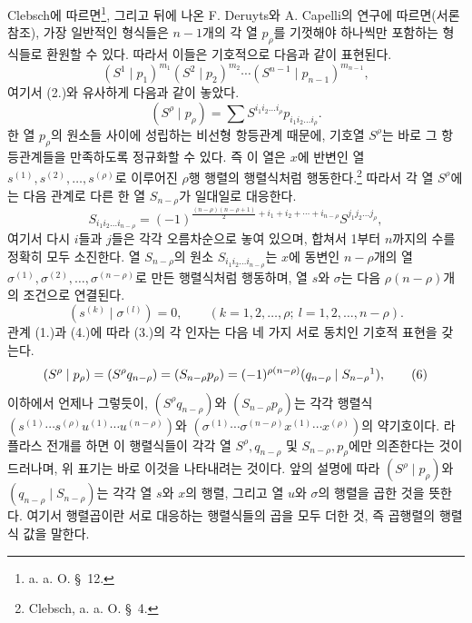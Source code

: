 Clebsch에 따르면\footnote{a. a. O. \S\ 12.}, 그리고 뒤에 나온 F. Deruyts와 A. Capelli의 연구에 따르면(서론 참조), 가장 일반적인 형식들은 $n-1$개의 각 열 $p_\rho$를 기껏해야 하나씩만 포함하는 형식들로 환원할 수 있다. 따라서 이들은 기호적으로 다음과 같이 표현된다.
\begin{equation}
 (S^1\mid p_1)^{m_1}(S^2\mid p_2)^{m_2}\cdots(S^{n-1}\mid p_{n-1})^{m_{n-1}},
\tag{3}
\end{equation}
여기서 (2.)와 유사하게 다음과 같이 놓았다.
\[
 (S^\rho\mid p_\rho)=\sum S^{i_1i_2\ldots i_\rho}p_{i_1i_2\ldots i_\rho}.
\]
한 열 $p_\rho$의 원소들 사이에 성립하는 비선형 항등관계 때문에, 기호열 $S^\rho$는 바로 그 항등관계들을 만족하도록 정규화할 수 있다. 즉 이 열은 $x$에 반변인 열 $s^{(1)},s^{(2)},\ldots,s^{(\rho)}$로 이루어진 $\rho$행 행렬의 행렬식처럼 행동한다.\footnote{Clebsch, a. a. O. \S\ 4.} 따라서 각 열 $S^\rho$에는 다음 관계로 다른 한 열 $S_{n-\rho}$가 일대일로 대응한다.
\begin{equation}
 S_{i_1i_2\ldots i_{n-\rho}}=(-1)^{\frac{(n-\rho)(n-\rho+1)}2+i_1+i_2+\cdots+i_{n-\rho}}S^{j_1j_2\ldots j_\rho},
\tag{4}
\end{equation}
여기서 다시 $i$들과 $j$들은 각각 오름차순으로 놓여 있으며, 합쳐서 1부터 $n$까지의 수를 정확히 모두 소진한다. 열 $S_{n-\rho}$의 원소 $S_{i_1i_2\ldots i_{n-\rho}}$는 $x$에 동변인 $n-\rho$개의 열 $\sigma^{(1)},\sigma^{(2)},\ldots,\sigma^{(n-\rho)}$로 만든 행렬식처럼 행동하며, 열 $s$와 $\sigma$는 다음 $\rho(n-\rho)$개의 조건으로 연결된다.
\begin{equation}
 (s^{(k)}\mid \sigma^{(l)})=0,\qquad(k=1,2,\ldots,\rho;\ l=1,2,\ldots,n-\rho).
\tag{5}
\end{equation}
관계 (1.)과 (4.)에 따라 (3.)의 각 인자는 다음 네 가지 서로 동치인 기호적 표현을 갖는다.
\begin{equation}
 (S^\rho\mid p_\rho)=(S^\rho q_{n-\rho})=(S_{n-\rho}p_\rho)=(-1)^{\rho(n-\rho)}(q_{n-\rho}\mid S_{n-\rho}\footnotemark),
\tag{6}
\end{equation}
이하에서 언제나 그렇듯이, $(S^\rho q_{n-\rho})$와 $(S_{n-\rho}p_\rho)$는 각각 행렬식
$(s^{(1)}\cdots s^{(\rho)}u^{(1)}\cdots u^{(n-\rho)})$와
$(\sigma^{(1)}\cdots\sigma^{(n-\rho)}x^{(1)}\cdots x^{(\rho)})$의 약기호이다. 라플라스 전개를 하면 이 행렬식들이 각각 열 $S^\rho,q_{n-\rho}$ 및 $S_{n-\rho},p_\rho$에만 의존한다는 것이 드러나며, 위 표기는 바로 이것을 나타내려는 것이다. 앞의 설명에 따라 $(S^\rho\mid p_\rho)$와 $(q_{n-\rho}\mid S_{n-\rho})$는 각각 열 $s$와 $x$의 행렬, 그리고 열 $u$와 $\sigma$의 행렬을 곱한 것을 뜻한다. 여기서 행렬곱이란 서로 대응하는 행렬식들의 곱을 모두 더한 것, 즉 곱행렬의 행렬식 값을 말한다.

